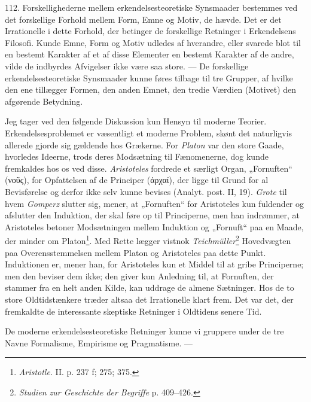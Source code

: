 \documentclass[12pt,a4paper]{book}
\newcommand{\opage}[1]{\marginnote{\footnotesize\textit{[#1]}}}
\begin{document}
112. Forskellighederne mellem erkendelsesteoretiske Synsmaader bestemmes ved det
forskellige Forhold mellem Form, Emne og Motiv, de hævde. Det er det Irrationelle i
dette Forhold, der betinger de forskellige Retninger i Erkendelsens Filosofi. Kunde
Emne, Form og Motiv udledes af hverandre, eller svarede blot til en bestemt
Karakter af et af disse Elementer en bestemt Karakter af de andre, vilde de
indbyrdes Afvigelser ikke være saa store. --- De forskellige erkendelsesteoretiske
Synsmaader kunne føres tilbage til tre Grupper, af hvilke den ene tillægger Formen,
den anden Emnet, den tredie Værdien (Motivet) den afgørende Betydning.

Jeg tager ved den følgende Diskussion kun Hensyn til moderne Teorier.
Erkendelsesproblemet er væsentligt et moderne Problem, skønt det naturligvis
allerede gjorde sig gældende hos Grækerne. For \emph{Platon} var den store Gaade,
hvorledes Ideerne, trods deres Modsætning til Fænomenerne, dog kunde fremkaldes hos
os ved disse. \emph{Aristoteles} fordrede et særligt Organ, „Fornuften“ (νοῦς), for
Opfattelsen af de Principer (ἀρχαί), der ligge til Grund for al Bevisførelse og
derfor ikke selv kunne bevises (Analyt. post. II, 19). \emph{Grote} til hvem
\emph{Gomperz} slutter sig, mener, at „Fornuften“ for Aristoteles kun fuldender og
afslutter den Induktion, der \opage{266} skal føre op til Principerne, men han indrømmer, at
Aristoteles betoner Modsætningen mellem Induktion og „Fornuft“ paa en Maade, der
minder om Platon\footnote{\emph{Aristotle}. II. p. 237 f; 275; 375.}. Med Rette
lægger vistnok \emph{Teichmüller}\footnote{\emph{Studien zur Geschichte der
Begriffe} p. 409--426.} Hovedvægten paa Overensstemmelsen mellem Platon og
Aristoteles paa dette Punkt. Induktionen er, mener han, for Aristoteles kun et
Middel til at gribe Principerne; men den beviser dem ikke; den giver kun Anledning
til, at Fornuften, der stammer fra en helt anden Kilde, kan uddrage de almene
Sætninger. Hos de to store Oldtidstænkere træder altsaa det Irrationelle klart
frem. Det var det, der fremkaldte de interessante skeptiske Retninger i Oldtidens
senere Tid.

De moderne erkendelsesteoretiske Retninger kunne vi gruppere under de tre Navne
Formalisme, Empirisme og Pragmatisme. ---
\end{document}
